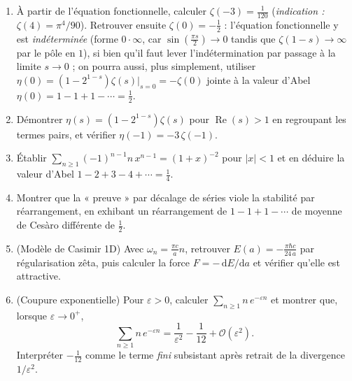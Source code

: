 \begin{mdframed}[style=exobar]
  \begin{enumerate}
    \item À partir de l'équation fonctionnelle, calculer $\zeta(-3)=\tfrac{1}{120}$
          (\textit{indication :} $\zeta(4)=\pi^4/90$). Retrouver ensuite
          $\zeta(0)=-\tfrac12$ : l'équation fonctionnelle y est \emph{indéterminée}
          (forme $0\cdot\infty$, car $\sin(\tfrac{\pi s}{2})\to 0$ tandis que
          $\zeta(1-s)\to\infty$ par le pôle en $1$), si bien qu'il faut lever
          l'indétermination par passage à la limite $s\to 0$ ; on pourra aussi,
          plus simplement, utiliser $\eta(0)=(1-2^{1-s})\zeta(s)\big|_{s=0}=-\zeta(0)$
          jointe à la valeur d'Abel $\eta(0)=1-1+1-\cdots=\tfrac12$.

    \item Démontrer $\eta(s)=(1-2^{1-s})\zeta(s)$ pour $\operatorname{Re}(s)>1$ en
          regroupant les termes pairs, et vérifier $\eta(-1)=-3\,\zeta(-1)$.

    \item Établir $\sum_{n\geq1}(-1)^{n-1}n\,x^{n-1}=(1+x)^{-2}$ pour $|x|<1$ et en
          déduire la valeur d'Abel $1-2+3-4+\cdots=\tfrac14$.

    \item Montrer que la « preuve » par décalage de séries viole la stabilité par
          réarrangement, en exhibant un réarrangement de $1-1+1-\cdots$ de moyenne
          de Cesàro différente de $\tfrac12$.

    \item (Modèle de Casimir 1D) Avec $\omega_n=\tfrac{\pi c}{a}n$, retrouver
          $E(a)=-\tfrac{\pi\hbar c}{24\,a}$ par régularisation zêta, puis calculer
          la force $F=-\,\mathrm{d}E/\mathrm{d}a$ et vérifier qu'elle est
          attractive.

    \item (Coupure exponentielle) Pour $\varepsilon>0$, calculer
          $\sum_{n\geq1} n\,e^{-\varepsilon n}$ et montrer que, lorsque
          $\varepsilon\to 0^{+}$,
          \[
            \sum_{n\geq1} n\,e^{-\varepsilon n}=\frac{1}{\varepsilon^{2}}
              -\frac{1}{12}+\mathcal{O}(\varepsilon^{2}).
          \]
          Interpréter $-\tfrac1{12}$ comme le terme \emph{fini} subsistant après
          retrait de la divergence $1/\varepsilon^2$.
  \end{enumerate}
\end{mdframed}

